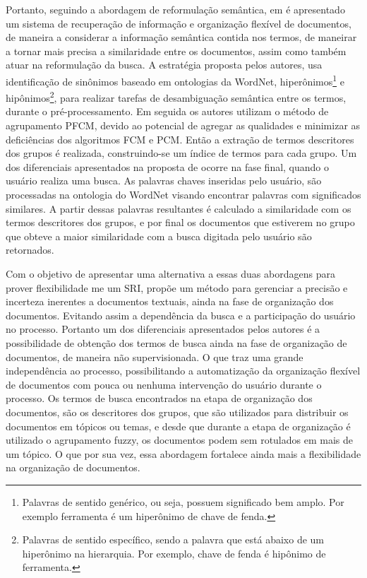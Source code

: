 Portanto, seguindo a abordagem de reformulação semântica, em \cite{Murali2015} é apresentado um 
sistema de recuperação de informação e organização flexível de
documentos, de maneira a considerar a informação semântica contida nos termos, de maneirar a tornar
mais precisa a similaridade entre os documentos, assim como também atuar na reformulação da busca. 
A estratégia proposta pelos autores, usa
identificação de sinônimos baseado em ontologias da WordNet, 
hiperônimos\footnote{Palavras de sentido genérico, ou seja, 
  possuem significado bem amplo. Por exemplo
ferramenta é um hiperônimo de chave de fenda.} 
e hipônimos\footnote{Palavras de sentido específico, sendo a palavra que está abaixo de um 
  hiperônimo na
hierarquia. Por exemplo, chave de fenda é hipônimo de ferramenta.}, para realizar tarefas de
desambiguação semântica entre os termos, durante o pré-processamento. Em seguida os autores utilizam
o método de agrupamento PFCM, devido ao potencial de agregar as qualidades e minimizar as
deficiências dos algoritmos FCM e PCM. Então a extração de termos descritores dos grupos é
realizada, construindo-se um índice de termos para cada grupo. Um dos diferenciais apresentados na
proposta de \cite{Murali2015} ocorre na fase final, quando o usuário realiza uma busca. As palavras
chaves inseridas pelo usuário, são processadas na ontologia do WordNet visando encontrar palavras
com significados similares. A partir dessas palavras resultantes é calculado a similaridade com os
termos descritores dos grupos, e por final os documentos que estiverem no grupo que obteve a maior
similaridade com a busca digitada pelo usuário são retornados.

Com o objetivo de apresentar uma alternativa a essas duas abordagens para prover flexibilidade me um
SRI, \cite{Nogueira2012} propõe um método para gerenciar a precisão e incerteza inerentes a
documentos textuais, ainda na fase de organização dos documentos. Evitando assim a dependência da
busca e a participação do usuário no processo. Portanto um dos diferenciais apresentados pelos
autores é a possibilidade de obtenção dos termos de busca ainda na fase de organização de
documentos, de maneira não supervisionada. O que traz uma grande independência ao processo,
possibilitando a automatização da organização flexível de documentos com pouca ou nenhuma
intervenção do usuário durante o processo. Os termos de busca encontrados na etapa de organização
dos documentos, são os descritores dos grupos, que são utilizados para distribuir os documentos em
tópicos ou temas, e desde que durante a etapa de organização é utilizado o agrupamento fuzzy, os
documentos podem sem rotulados em mais de um tópico. O que por sua vez, essa abordagem fortalece
ainda mais a flexibilidade na organização de documentos.

